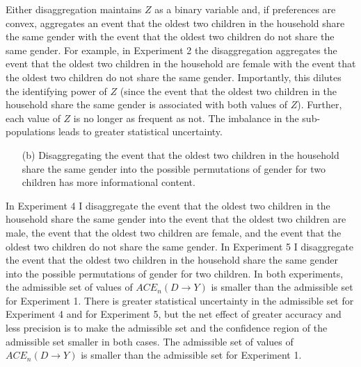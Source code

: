 \documentclass[10pt,a4paper,twoside]{article}
\numberwithin{equation}{section}
\begin{document}
Either disaggregation maintains $Z$ as a binary variable and, if preferences are convex, aggregates an event that the oldest two children in the household share the same gender with the event that the oldest two children do not share the same gender. For example, in Experiment 2 the disaggregation aggregates the event that the oldest two children in the household are female with the event that the oldest two children do not share the same gender. Importantly, this dilutes the identifying power of $Z$ (since the event that the oldest two children in the household share the same gender is associated with both values of $Z$). Further, each value of $Z$ is no longer as frequent as not. The imbalance in the sub-populations leads to greater statistical uncertainty. 
\begin{enumerate}
\item[(b)] Disaggregating the event that the oldest two children in the household share the same gender into the possible permutations of gender for two children has more informational content.
\end{enumerate}
In Experiment 4 I disaggregate the event that the oldest two children in the household share the same gender into the event that the oldest two children are male, the event that the oldest two children are female, and the event that the oldest two children do not share the same gender. In Experiment 5 I disaggregate the event that the oldest two children in the household share the same gender into the possible permutations of gender for two children. In both experiments, the admissible set of values of $ACE_n(D\rightarrow Y)$ is smaller than the admissible set for Experiment 1. There is greater statistical uncertainty in the admissible set for Experiment 4 and for Experiment 5, but the net effect of greater accuracy and less precision is to make the admissible set and the confidence region of the admissible set smaller in both cases. The admissible set of values of $ACE_n(D\rightarrow Y)$ is smaller than the admissible set for Experiment 1. 
\end{document}

